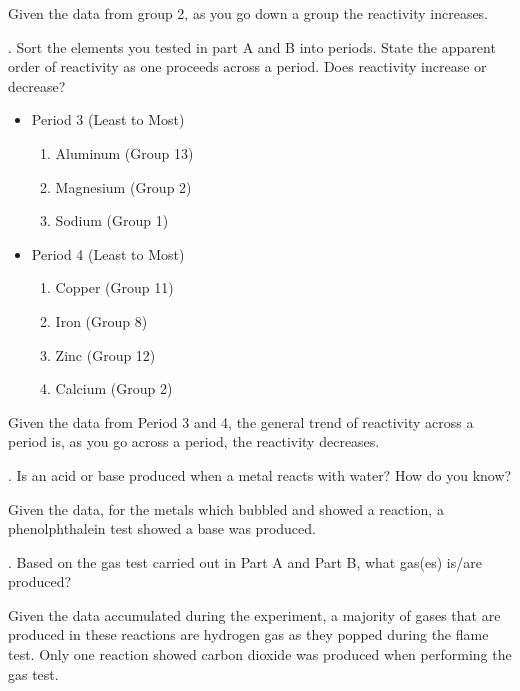 \documentclass[12pt]{article}
\begin{document}
    Given the data from group 2, as you go down a group the reactivity increases.

    \medskip
    . Sort the elements you tested in part A and B into periods. State the apparent order of reactivity as one proceeds across a period. Does reactivity increase or decrease?

    \begin{multicols}{2}
        \begin{itemize}
            \item Period 3 (Least to Most)
            \begin{enumerate}
                \item Aluminum (Group 13)
                \item Magnesium (Group 2)
                \item Sodium (Group 1)
            \end{enumerate}
            \columnbreak
            \item Period 4 (Least to Most)
            \begin{enumerate}
                \item Copper (Group 11)
                \item Iron (Group 8)
                \item Zinc (Group 12)
                \item Calcium (Group 2)
            \end{enumerate}
        \end{itemize}
    \end{multicols}

    Given the data from Period 3 and 4, the general trend of reactivity across a period is, as you go across a period, the reactivity decreases.

    \bigskip
    . Is an acid or base produced when a metal reacts with water? How do you know? 

    Given the data, for the metals which bubbled and showed a reaction, a phenolphthalein test showed a base was produced.

    \bigskip
    . Based on the gas test carried out in Part A and Part B, what gas(es) is/are produced?

    Given the data accumulated during the experiment, a majority of gases that are produced in these reactions are hydrogen gas as they popped during the flame test. Only one reaction showed carbon dioxide was produced when performing the gas test.
\end{document}
